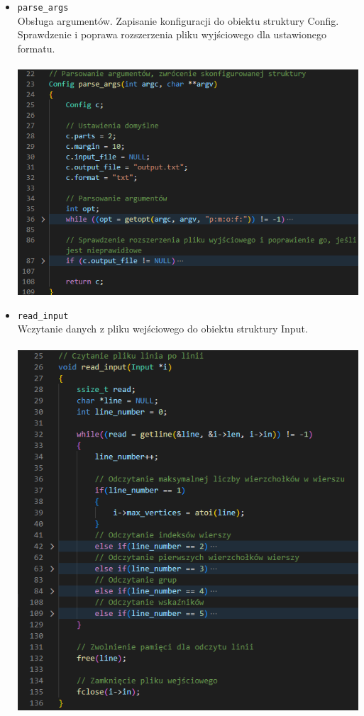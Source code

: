 \documentclass{article}
\begin{document}
    \begin{itemize}
    
        \item \texttt{parse\_args} \\
        Obsługa argumentów. Zapisanie konfiguracji do obiektu struktury Config. Sprawdzenie i poprawa rozszerzenia pliku wyjściowego dla ustawionego formatu. \\\\      \includegraphics[width=0.8\linewidth, center]{img/parse_args.png}

        \item \texttt{read\_input} \\
        Wczytanie danych z pliku wejściowego do obiektu struktury Input. \\\\      \includegraphics[width=0.8\linewidth, center]{img/read_input.png}
        

\end{itemize}
\end{document}
